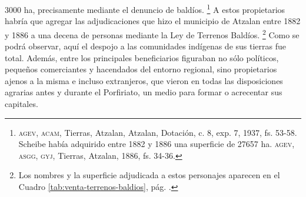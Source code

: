 \documentclass[14pt,twoside,final]{extbook} %
\let\oldfootnote\footnote
\renewcommand\footnote[1]{%
\oldfootnote{\hspace{1mm}#1}}
\begin{document}
3000 ha, precisamente mediante el denuncio de baldíos.\footnote{\textsc{agev, acam}, Tierras, Atzalan, Atzalan, Dotación, c. 8, exp. 7, 1937, fs. 53-58. Scheibe\index[nombres]{Scheibe, Gustavo} había adquirido entre 1882 y 1886 una superficie de 27657 ha. \textsc{agev, asgg, gyj}, Tierras, Atzalan, 1886, fs. 34-36.} A estos propietarios habría que agregar las adjudicaciones que hizo el municipio de Atzalan entre 1882 y 1886 a una decena de personas mediante la Ley de Terrenos Baldíos.\footnote{Los nombres y la superficie adjudicada a estos personajes aparecen en el Cuadro  \ref{tab:venta-terrenos-baldios}, pág. \pageref{tab:venta-terrenos-baldios}.} Como se podrá observar, aquí el despojo a las comunidades indígenas de sus tierras fue total. Además, entre los principales beneficiarios figuraban no sólo políticos, pequeños comerciantes y hacendados del entorno regional, sino propietarios ajenos a la misma e incluso extranjeros, que vieron en todas las disposiciones agrarias antes y durante el Porfiriato, un medio para formar o acrecentar sus capitales.
\end{document}
